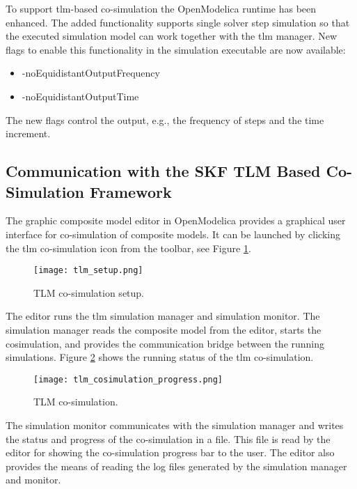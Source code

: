 To support \acrshort{tlm}-based co-simulation the OpenModelica runtime has been enhanced. The added
functionality supports single solver step simulation so that the executed simulation model can work together
with the \acrshort{tlm} manager. New flags to enable this functionality in the simulation executable are now available:

\begin{itemize}
		
\item -noEquidistantOutputFrequency
\item -noEquidistantOutputTime

\end{itemize}

The new flags control the output, e.g., the frequency of
steps and the time increment. 

\subsection{Communication with the SKF TLM Based Co-Simulation Framework}
\label{sec:tlmskf}

The graphic composite model editor in OpenModelica
provides a graphical user interface for co-simulation of
composite models. It can be launched by clicking the
\acrshort{tlm} co-simulation icon from the toolbar, see
Figure \ref{fig:tlmsetup}.

\begin{figure}
	\texttt{[image: tlm\_setup.png]}
	\caption{TLM co-simulation setup.}
	\label{fig:tlmsetup}
\end{figure}

The editor runs the \acrshort{tlm} simulation manager and simulation monitor. The simulation manager reads the
composite model from the editor, starts the cosimulation, and provides the communication bridge
between the running simulations. Figure \ref{fig:tlmcosimulationprogress} shows the running status of the \acrshort{tlm} co-simulation.

\begin{figure}
	\texttt{[image: tlm\_cosimulation\_progress.png]}
	\caption{TLM co-simulation.}
	\label{fig:tlmcosimulationprogress}
\end{figure}

The simulation monitor communicates with the simulation manager and writes the status and progress of the co-simulation in a file. This file is read by the editor for showing the co-simulation progress bar to the user. The editor also provides the means of reading the log files generated by the simulation manager and monitor.

